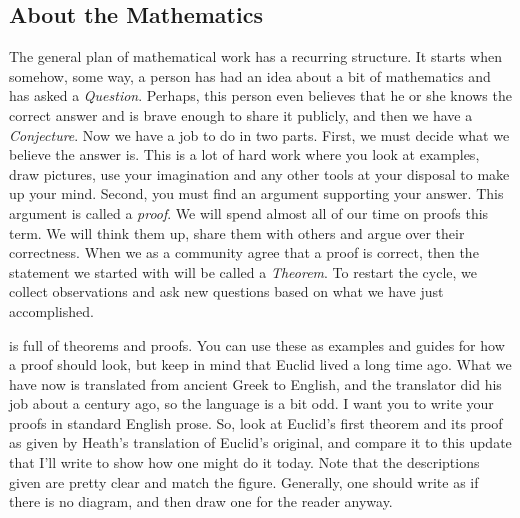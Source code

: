 \documentclass{tufte-handout}
\theoremstyle{definition}
\begin{document}
\subsection*{About the Mathematics}
The general plan of mathematical work has a recurring structure. 
It starts when somehow, some way, a person has had an idea about a bit of mathematics and has asked a \emph{Question}. 
Perhaps, this person even believes that he or she knows the correct answer and is brave enough to share it publicly, and then we have a \emph{Conjecture}.
Now we have a job to do in two parts. First, we must decide what we believe the answer is. 
This is a lot of hard work where you look at examples, draw pictures, use your imagination and any other tools at your disposal to make up your mind. 
Second, you must find an argument supporting your answer. This argument is called a \emph{proof}. 
We will spend almost all of our time on proofs this term. We will think them up, share them with others and argue over their correctness. 
When we as a community agree that a proof is correct, then the statement we started with will be called a \emph{Theorem}.
To restart the cycle, we collect observations and ask new questions based on what we have just accomplished.

 is full of theorems and proofs. 
 You can use these as examples and guides for how a proof should look, but keep in mind that Euclid lived a long time ago. 
 What we have now is translated from ancient Greek to English, and the translator did his job about a century ago, so the language is a bit odd. 
I want you to write your proofs in standard English prose. 
So, look at Euclid's first theorem and its proof as given by Heath's translation of Euclid's original, and compare it to this update that I'll write to show how one might do it today. 
Note that the descriptions given are pretty clear and match the figure.
Generally, one should write as if there is no diagram, and then draw one for the reader anyway.
\end{document}
